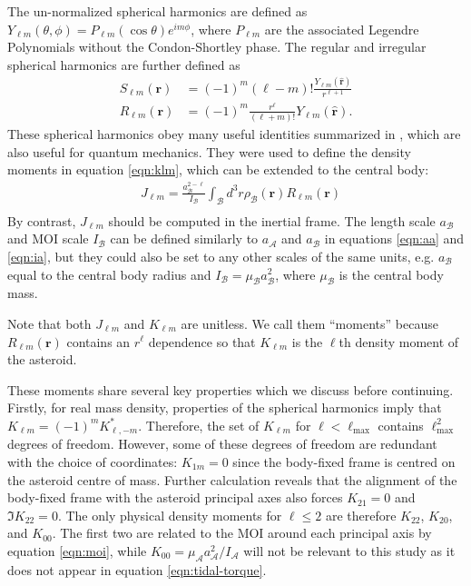 \documentclass[fleqn,usenatbib]{mnras}
\newcommand{\unit}[1]{\bm{\hat{#1}}}
\begin{document}
The un-normalized spherical harmonics are defined as $Y_{\ell m}(\theta, \phi) = P_{\ell m}(\cos \theta)e^{im\phi}$, where $P_{\ell m}$ are the associated Legendre Polynomials without the Condon-Shortley phase. The regular and irregular spherical harmonics are further defined as
\begin{equation}
  \begin{split}
    S_{\ell m}(\bm r) &= (-1)^m (\ell - m)! \frac{Y_{\ell m}(\unit r)}{r^{\ell+1}} \\
    R_{\ell m} (\bm r) &= (-1)^m \frac{r^\ell}{(\ell + m)!} Y_{\ell m}(\unit r).
  \end{split}
\end{equation}
These spherical harmonics obey many useful identities summarized in \cite{Gelderen1998TheSO}, which are also useful for quantum mechanics. They were used to define the density moments in equation \ref{eqn:klm}, which can be extended to the central body:
\begin{equation}
  \begin{split}
    &J_{\ell m} = \frac{a_\mathcal{B}^{2-\ell}}{I_\mathcal{B}} \int_\mathcal{B} d^3 r \rho_\mathcal{B}(\bm r) R_{\ell m}(\bm r)\\
  \end{split}
  \label{eqn:jlm}
\end{equation}
By contrast, $J_{\ell m}$ should be computed in the inertial frame. The length scale $a_\mathcal{B}$ and MOI scale $I_\mathcal{B}$ can be defined similarly to $a_\mathcal{A}$ and $a_\mathcal{B}$ in equations \ref{eqn:aa} and \ref{eqn:ia}, but they could also be set to any other scales of the same units, e.g. $a_\mathcal{B}$ equal to the central body radius and $I_\mathcal{B} = \mu_\mathcal{B}a_\mathcal{B}^2$, where $\mu_\mathcal{B}$ is the central body mass.

Note that both $J_{\ell m}$ and $K_{\ell m}$ are unitless. We call them ``moments'' because $R_{\ell m}(\bm r)$ contains an $r^\ell$ dependence so that $K_{\ell m}$ is the $\ell$th density moment of the asteroid.

These moments share several key properties which we discuss before continuing. Firstly, for real mass density, properties of the spherical harmonics imply that $K_{\ell m} = (-1)^m K_{\ell, -m}^*$. Therefore, the set of $K_{\ell m}$ for $\ell < \ell_\text{max}$ contains $\ell_\text{max}^2$ degrees of freedom. However, some of these degrees of freedom are redundant with the choice of coordinates: $K_{1m} = 0$ since the body-fixed frame is centred on the asteroid centre of mass. Further calculation reveals that the alignment of the body-fixed frame with the asteroid principal axes also forces $K_{21}= 0$ and $\Im K_{22}=0$. The only physical density moments for $\ell \leq 2$ are therefore $K_{22}$, $K_{20}$, and $K_{00}$. The first two are related to the MOI around each principal axis by equation \ref{eqn:moi}, while $K_{00} = \mu_\mathcal{A} a_\mathcal{A}^2 / I_\mathcal{A}$ will not be relevant to this study as it does not appear in equation \ref{eqn:tidal-torque}. 
\end{document}

